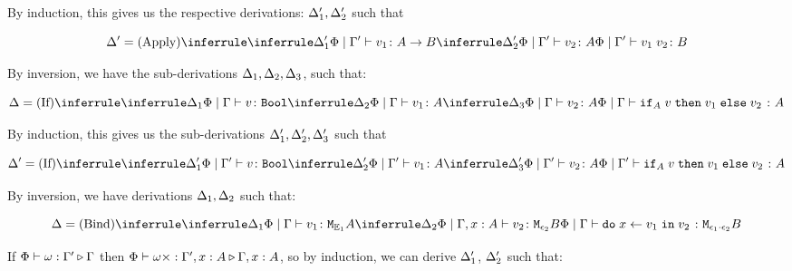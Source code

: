 {        By induction, this gives us the respective derivations: $\Delta_1',\Delta_2'$ such that

        
        \begin{equation}
            \D' = 
            \ntreeruleII{Apply}{
                \treeruleI{\D_1'}{\etyperelation{\P}{\G'}{v_1}{\ab}}
                }{
                \treeruleI{\D_2'}{\etyperelation{\P}{\G'}{v_2}{A}}
            } {
                \etyperelation{\P}{\G'}{\apply{v_1}{v_2}}{B}
            }
        \end{equation}

    By inversion, we have the sub-derivations $\Delta_1,\Delta_2,\Delta_3$, such that:


    \begin{equation}
        \D = \ntreeruleIII{If}{
            \treeruleI{\D_1}{\etyperelation{\P}{\G}{v}{\B}}
            }{
            \treeruleI{\D_2}{\etyperelation{\P}{\G}{v_1}{A}}
            }{
            \treeruleI{\D_3}{\etyperelation{\P}{\G}{v_2}{A}}
        }{
            \etyperelation{\P}{\G}{\pifthenelse{A}{v}{v_1}{v_2}}{A}
        }
    \end{equation}

    By induction, this gives us the sub-derivations $\Delta_1', \Delta_2', \Delta_3'$ such that

    \begin{equation}
        \D' = \ntreeruleIII{If}{
            \treeruleI{\D_1'}{\etyperelation{\P}{\G'}{v}{\B}}
            }{
            \treeruleI{\D_2'}{\etyperelation{\P}{\G'}{v_1}{A}}
            }{
            \treeruleI{\D_3'}{\etyperelation{\P}{\G'}{v_2}{A}}
        }{
            \etyperelation{\P}{\G'}{\pifthenelse{A}{v}{v_1}{v_2}}{A}
        }
    \end{equation}
   
    By inversion, we have derivations $\Delta_1, \Delta_2$ such that:


    \begin{equation}
        \D = \ntreeruleII{Bind}{
            \treeruleI{\D_1}{\etyperelation{\P}{\G}{v_1}{\M{\E_1}{A}}}
            }{
            \treeruleI{\D_2}{\etyperelation{\P}{\G,x: A}{v_2}{\M{\e_2}{B}}}
        }{
            \etyperelation{\P}{\G}{\doin{x}{v_1}{v_2}}{\M{\e_1\dot\e_2}{B}}
        }
    \end{equation}

    If $\Phi\vdash \omega : \Gamma' \triangleright \Gamma$ then $\Phi\vdash \omega\times : \Gamma',x:A \triangleright \Gamma, x: A$, so by induction, we can derive $\Delta_1'$, $\Delta_2'$ such that:

}
